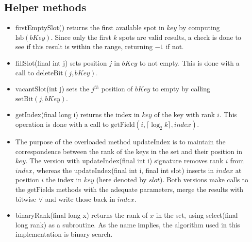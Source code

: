 \subsection{Helper methods} \label{sec:binaryRankHelperMethods}
\begin{itemize}
    \item
    {\ttfamily firstEmptySlot()} returns the first available spot in $key$ by computing $\text{lsb}(bKey)$. Since only the first $k$ spots are valid results, a check is done to see if this result is within the range, returning $-1$ if not.
    
    \item
    {\ttfamily fillSlot(final int j)} sets position $j$ in $bKey$ to not empty. This is done with a call to $\text{deleteBit}(j, bKey)$.
    
    \item
    {\ttfamily vacantSlot(int j)} sets the $j^{th}$ position of $bKey$ to empty by calling $\text{setBit}(j, bKey)$.
    
    \item
    {\ttfamily getIndex(final long i)} returns the index in $key$ of the key with rank $i$. This operation is done with a call to $\text{getField}(i, \lceil \log_2 k\rceil, index)$.
    
    \item
    The purpose of the overloaded method {\ttfamily updateIndex} is to maintain the correspondence between the rank of the keys in the set and their position in $key$.
    The version with {\ttfamily updateIndex(final int i)} signature removes rank $i$ from $index$, whereas the {\ttfamily updateIndex(final int i, final int slot)} inserts in $index$ at position $i$ the index in $key$ (here denoted by $slot$). Both versions make calls to the $\text{getFields}$ methods with the adequate parameters, merge the results with bitwise $\vee$ and write those back in $index$.
    
    \item
    {\ttfamily binaryRank(final long x)} returns the rank of $x$ in the set, using {\ttfamily select(final long rank)} as a subroutine. As the name implies, the algorithm used in this implementation is binary search.
\end{itemize}

